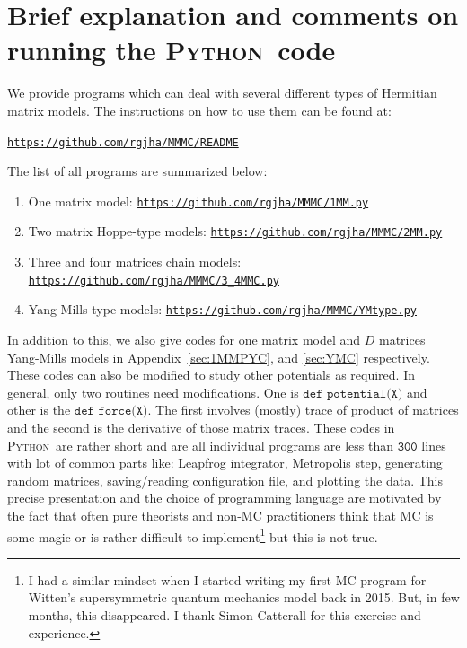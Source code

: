 \documentclass[letter,11pt]{article}
\newcommand{\PY}{\textsc{Python}}
\begin{document}
\section{\label{sec:BEOC}Brief explanation and comments on 
running the \PY~code}
We provide programs which can deal with several different types of Hermitian matrix models. The instructions on how to use them can be found at:  
\begin{center} \texttt{\href{https://github.com/rgjha/MMMC\#readme}{https://github.com/rgjha/MMMC/README}} \end{center}
 The list of all programs are summarized below:
\begin{enumerate}
	\item One matrix model: \texttt{\href{https://github.com/rgjha/MMMC/1MM.py}{https://github.com/rgjha/MMMC/1MM.py}}
	\item Two matrix Hoppe-type models: \texttt{\href{https://github.com/rgjha/MMMC/2MM.py}{https://github.com/rgjha/MMMC/2MM.py}}  
	\item Three and four matrices chain models: \texttt{\href{https://github.com/rgjha/MMMC/3_4MMC.py}{https://github.com/rgjha/MMMC/3\_4MMC.py}}
	\item Yang-Mills type models: \texttt{\href{https://github.com/rgjha/MMMC/YMtype.py}{https://github.com/rgjha/MMMC/YMtype.py}}
\end{enumerate}
In addition to this, we also give codes for one matrix model and $D$ matrices Yang-Mills models in Appendix~\ref{sec:1MMPYC}, and \ref{sec:YMC} respectively.
These codes can also be modified to study other potentials as required. In general, only two routines need modifications. 
One is $\texttt{def potential(X)}$ and other is the $\texttt{def force(X)}$. 
The first involves (mostly) trace of product of matrices and the second is the 
derivative of those matrix traces. 
These codes in \PY~are rather short
and are all individual programs are less than $\texttt{300}$ lines 
with lot of common parts like: Leapfrog integrator, Metropolis step, generating random matrices, saving/reading configuration file, and plotting the data. 
This precise presentation and the choice of programming language are motivated by the fact that often pure theorists and non-MC practitioners think that 
MC is some magic or is rather difficult to implement\footnote{I had a similar mindset when I started writing my first MC program for Witten's supersymmetric 
quantum mechanics model back in 2015. But, in few months, this disappeared. I thank Simon Catterall for this exercise and experience.} but this is not true. 
\end{document}
